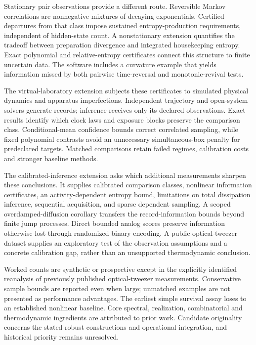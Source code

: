 \documentclass[11pt,oneside]{book}
\theoremstyle{definition}
\theoremstyle{remark}
\begin{document}
Stationary pair observations provide a different route. Reversible Markov
correlations are nonnegative mixtures of decaying exponentials. Certified
departures from that class impose sustained entropy-production requirements,
independent of hidden-state count. A nonstationary extension quantifies the
tradeoff between preparation divergence and integrated housekeeping entropy.
Exact polynomial and relative-entropy certificates connect this structure to
finite uncertain data. The software includes a curvature example that yields
information missed by both pairwise time-reversal and monotonic-revival tests.

The virtual-laboratory extension subjects these certificates to simulated
physical dynamics and apparatus imperfections. Independent trajectory and
open-system solvers generate records; inference receives only its declared
observations. Exact results identify which clock laws and exposure blocks
preserve the comparison class. Conditional-mean confidence bounds correct
correlated sampling, while fixed polynomial contrasts avoid an unnecessary
simultaneous-box penalty for predeclared targets. Matched comparisons retain
failed regimes, calibration costs and stronger baseline methods.

The calibrated-inference extension asks which additional measurements sharpen
these conclusions. It supplies calibrated comparison classes, nonlinear
information certificates, an activity-dependent entropy bound, limitations on
total dissipation inference, sequential acquisition, and sparse dependent
sampling. A scoped overdamped-diffusion corollary transfers the record-information
bounds beyond finite jump processes. Direct bounded analog scores preserve information otherwise lost
through randomized binary encoding. A public optical-tweezer dataset supplies
an exploratory test of the observation assumptions and a concrete calibration
gap, rather than an unsupported thermodynamic conclusion.

Worked counts are synthetic or prospective except in the explicitly identified
reanalysis of previously published optical-tweezer measurements. Conservative sample bounds
are reported even when large; unmatched examples are not presented as
performance advantages. The earliest simple survival assay loses to an
established nonlinear baseline. Core spectral, realization, combinatorial and
thermodynamic ingredients are attributed to prior work. Candidate originality
concerns the stated robust constructions and operational integration, and
historical priority remains unresolved.
\end{document}
